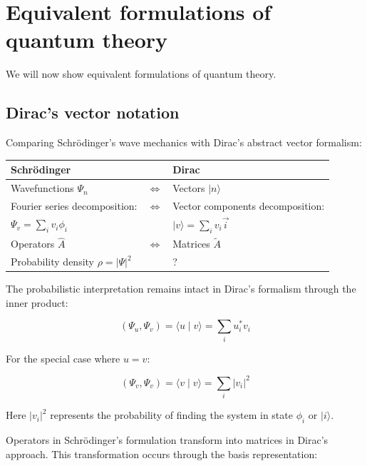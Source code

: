 \chapter{Equivalent formulations of quantum theory}

We will now show equivalent formulations of quantum theory.

\section{Dirac's vector notation}

Comparing Schrödinger's wave mechanics with Dirac's abstract vector formalism:

\begin{center}
\begin{tabular}{|l|l|l|}
\hline
Schrödinger &  & Dirac \\
\hline
Wavefunctions $\Psi_{n}$ & $\Longleftrightarrow$ & Vectors $|n\rangle$ \\
\hline
Fourier series decomposition: & $\Longleftrightarrow$ & Vector components decomposition: \\
\hline
$\Psi_{v}=\sum_{i} v_{i} \phi_{i}$ &  & $|v\rangle=\sum_{i} v_{i} \vec{i}$ \\
\hline
Operators $\hat{A}$ & $\Longleftrightarrow$ & Matrices $\tilde{A}$ \\
\hline
Probability density $\rho=|\Psi|^{2}$ &  & ? \\
\hline
\end{tabular}
\end{center}

The probabilistic interpretation remains intact in Dirac's formalism through the inner product:

\begin{equation}
\left(\Psi_{u}, \Psi_{v}\right)=\langle u \mid v\rangle=\sum_{i} u_{i}^{*} v_{i}
\end{equation}

For the special case where $u=v$:

\begin{equation}
\left(\Psi_{v}, \Psi_{v}\right)=\langle v \mid v\rangle=\sum_{i}\left|v_{i}\right|^{2}
\end{equation}

Here $\left|v_{i}\right|^{2}$ represents the probability of finding the system in state $\phi_{i}$ or $|i\rangle$.

Operators in Schrödinger's formulation transform into matrices in Dirac's approach. This transformation occurs through the basis representation:

